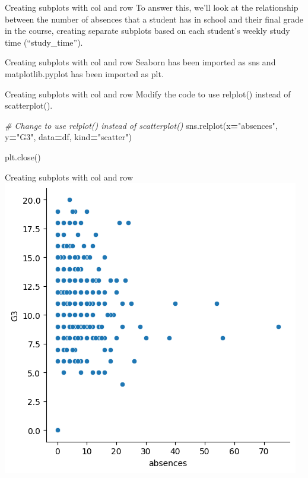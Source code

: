 \documentclass[
  ignorenonframetext,
]{beamer}
\newenvironment{Shaded}{\begin{snugshade}}{\end{snugshade}}
\newcommand{\CommentTok}[1]{\textcolor[rgb]{0.56,0.35,0.01}{\textit{#1}}}
\newcommand{\NormalTok}[1]{#1}
\newcommand{\OperatorTok}[1]{\textcolor[rgb]{0.81,0.36,0.00}{\textbf{#1}}}
\newcommand{\StringTok}[1]{\textcolor[rgb]{0.31,0.60,0.02}{#1}}
\begin{document}
\begin{frame}{Creating subplots with col and row}
\label{creating-subplots-with-col-and-row-1}
To answer this, we'll look at the relationship between the number of
absences that a student has in school and their final grade in the
course, creating separate subplots based on each student's weekly study
time (``study\_time'').
\end{frame}

\begin{frame}{Creating subplots with col and row}
\label{creating-subplots-with-col-and-row-2}
Seaborn has been imported as sns and matplotlib.pyplot has been imported
as plt.
\end{frame}

\begin{frame}[fragile]{Creating subplots with col and row}
\label{creating-subplots-with-col-and-row-3}
Modify the code to use relplot() instead of scatterplot().


\begin{Shaded}
\begin{Highlighting}[]
\CommentTok{\# Change to use relplot() instead of scatterplot()}
\NormalTok{sns.relplot(x}\OperatorTok{=}\StringTok{"absences"}\NormalTok{, y}\OperatorTok{=}\StringTok{"G3"}\NormalTok{, }
\NormalTok{            data}\OperatorTok{=}\NormalTok{df,}
\NormalTok{            kind}\OperatorTok{=}\StringTok{"scatter"}\NormalTok{)}


\NormalTok{plt.close()}
\end{Highlighting}
\end{Shaded}
\end{frame}

\begin{frame}{Creating subplots with col and row}
\label{creating-subplots-with-col-and-row-4}
\includegraphics{../images/im262.png}
\end{frame}
\end{document}
